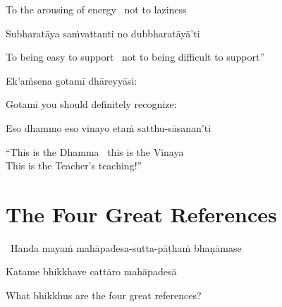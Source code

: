 \begin{english}
  To the arousing of energy \breathmark\ not to laziness
\end{english}

Subharatāya saṁvattanti no dubbharatāyā'ti

\begin{english}
  To being easy to support \breathmark\ not to being difficult to support''
\end{english}

Ek'aṁsena gotamī dhāreyyāsi:

\begin{english}
  Gotamī\makeatletter\hyperlink{endnote85-appendix}\makeatother \thinspace
  you should definitely recognize:
\end{english}

Eso dhammo eso vinayo etaṁ satthu-sāsanan'ti

\begin{english}
  ``This is the Dhamma \breathmark\ this is the Vinaya\\
  This is the Teacher's teaching!''
\end{english}

\suttaRef{[AN 8.53]}

\ifdigitalversion{}\fi



\section{The Four Great References}
\label{four-great-references}

\begin{leader}
  \anglebracketleft\ \hspace{-0.5mm}Handa mayaṁ mahāpadesa-sutta-pāṭhaṁ bhaṇāmase \hspace{-0.5mm}\anglebracketright\
\end{leader}

Katame bhikkhave cattāro mahāpadesā

\begin{english}
  What bhikkhus are the four great references?
\end{english}

